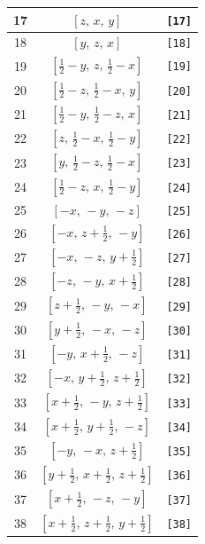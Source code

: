 \documentclass[fleqn,8pt]{jsarticle}
\begin{document}
\begin{longtable}{ccc}
17 & $\left[ z,\, x,\, y \right]$ & {\tt [17]} \\ \hline
18 & $\left[ y,\, z,\, x \right]$ & {\tt [18]} \\ \hline
19 & $\left[ \frac{1}{2} - y,\, z,\, \frac{1}{2} - x \right]$ & {\tt [19]} \\ \hline
20 & $\left[ \frac{1}{2} - z,\, \frac{1}{2} - x,\, y \right]$ & {\tt [20]} \\ \hline
21 & $\left[ \frac{1}{2} - y,\, \frac{1}{2} - z,\, x \right]$ & {\tt [21]} \\ \hline
22 & $\left[ z,\, \frac{1}{2} - x,\, \frac{1}{2} - y \right]$ & {\tt [22]} \\ \hline
23 & $\left[ y,\, \frac{1}{2} - z,\, \frac{1}{2} - x \right]$ & {\tt [23]} \\ \hline
24 & $\left[ \frac{1}{2} - z,\, x,\, \frac{1}{2} - y \right]$ & {\tt [24]} \\ \hline
25 & $\left[ - x,\, - y,\, - z \right]$ & {\tt [25]} \\ \hline
26 & $\left[ - x,\, z + \frac{1}{2},\, - y \right]$ & {\tt [26]} \\ \hline
27 & $\left[ - x,\, - z,\, y + \frac{1}{2} \right]$ & {\tt [27]} \\ \hline
28 & $\left[ - z,\, - y,\, x + \frac{1}{2} \right]$ & {\tt [28]} \\ \hline
29 & $\left[ z + \frac{1}{2},\, - y,\, - x \right]$ & {\tt [29]} \\ \hline
30 & $\left[ y + \frac{1}{2},\, - x,\, - z \right]$ & {\tt [30]} \\ \hline
31 & $\left[ - y,\, x + \frac{1}{2},\, - z \right]$ & {\tt [31]} \\ \hline
32 & $\left[ - x,\, y + \frac{1}{2},\, z + \frac{1}{2} \right]$ & {\tt [32]} \\ \hline
33 & $\left[ x + \frac{1}{2},\, - y,\, z + \frac{1}{2} \right]$ & {\tt [33]} \\ \hline
34 & $\left[ x + \frac{1}{2},\, y + \frac{1}{2},\, - z \right]$ & {\tt [34]} \\ \hline
35 & $\left[ - y,\, - x,\, z + \frac{1}{2} \right]$ & {\tt [35]} \\ \hline
36 & $\left[ y + \frac{1}{2},\, x + \frac{1}{2},\, z + \frac{1}{2} \right]$ & {\tt [36]} \\ \hline
37 & $\left[ x + \frac{1}{2},\, - z,\, - y \right]$ & {\tt [37]} \\ \hline
38 & $\left[ x + \frac{1}{2},\, z + \frac{1}{2},\, y + \frac{1}{2} \right]$ & {\tt [38]} \\ \hline

\end{longtable}
\end{document}
